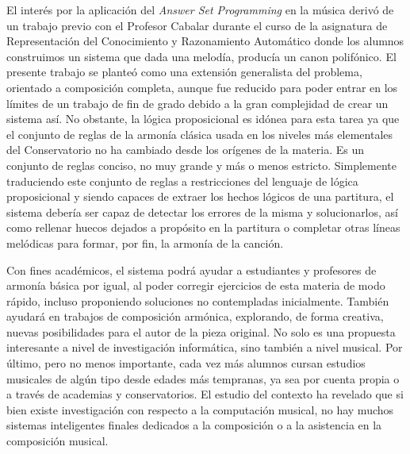 El interés por la aplicación del \textit{Answer Set Programming} en la música derivó de un trabajo previo con el Profesor Cabalar durante el curso de la asignatura de Representación del Conocimiento y Razonamiento Automático donde los alumnos construimos un sistema que dada una melodía, producía un canon polifónico. El presente trabajo se planteó como una extensión generalista del problema, orientado a composición completa, aunque fue reducido para poder entrar en los límites de un trabajo de fin de grado debido a la gran complejidad de crear un sistema así. No obstante, la lógica proposicional es idónea para esta tarea ya que el conjunto de reglas de la armonía clásica usada en los niveles más elementales del Conservatorio no ha cambiado desde los orígenes de la materia. Es un conjunto de reglas conciso, no muy grande y más o menos estricto. Simplemente traduciendo este conjunto de reglas a restricciones del lenguaje de lógica proposicional y siendo capaces de extraer los hechos lógicos de una partitura, el sistema debería ser capaz de detectar los errores de la misma y solucionarlos, así como rellenar huecos dejados a propósito en la partitura o completar otras líneas melódicas para formar, por fin, la armonía de la canción.

Con fines académicos, el sistema podrá ayudar a estudiantes y profesores de armonía básica por igual, al poder corregir ejercicios de esta materia de modo rápido, incluso proponiendo soluciones no contempladas inicialmente. También ayudará en trabajos de composición armónica, explorando, de forma creativa, nuevas posibilidades para el autor de la pieza original. No solo es una propuesta interesante a nivel de investigación informática, sino también a nivel musical. Por último, pero no menos importante, cada vez más alumnos cursan estudios musicales de algún tipo desde edades más tempranas, ya sea por cuenta propia o a través de academias y conservatorios. El estudio del contexto ha revelado que si bien existe investigación con respecto a la computación musical, no hay muchos sistemas inteligentes finales dedicados a la composición o a la asistencia en la composición musical.